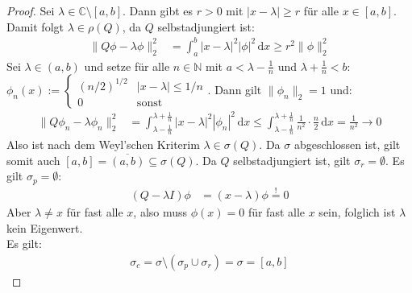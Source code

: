 \documentclass[a4paper,12pt]{article}
\newcommand{\intx}{}
\newcommand{\kla}{}
\newcommand{\klam}{}
\begin{document}
\begin{proof}
Sei $\lambda\in\mathbb{C}\setminus [a,b]$. Dann gibt es $r>0$ mit $|x-\lambda|\ge r$ für alle $x\in\klam\left[ {a, b} \right]$. Damit folgt $\lambda\in\rho(Q)$, da $Q$ selbstadjungiert ist:
\begin{align*}
\|Q\phi-\lambda\phi\|_2^2&=\intx\int_{a}^{b}|x-\lambda|^2|\phi|^2\,\mathrm{d}x\ge r^2\|\phi\|_2^2
\end{align*}
Sei $\lambda\in (a,b)$ und setze für alle $n\in\mathbb{N}$ mit $a<\lambda -\frac{1}{n}$ und $\lambda +\frac{1}{n}<b$: $\phi_n(x):=\left\{\begin{matrix}
(n/2)^{1/2} & |x-\lambda|\le 1/n \\
0 & \mathrm{sonst}
\end{matrix}\right.$. Dann gilt $\|\phi_n\|_2=1$ und:
\begin{align*}
\|Q\phi_n-\lambda\phi_n\|_2^2&=\intx\int_{\lambda-\frac{1}{n}}^{\lambda+\frac{1}{n}}|x-\lambda|^2|\phi_n|^2\,\mathrm{d}x\le\intx\int_{\lambda-\frac{1}{n}}^{\lambda+\frac{1}{n}}\frac{1}{n^2}\cdot\frac{n}{2}\,\mathrm{d}x=\frac{1}{n^2}\rightarrow 0
\end{align*}
Also ist nach dem Weyl'schen Kriterim $\lambda\in\sigma(Q)$. Da $\sigma$ abgeschlossen ist, gilt somit auch $\klam\left[ {a, b} \right]=\overline{\kla\left( {a, b} \right)}\subseteq\sigma(Q)$.
Da $Q$ selbstadjungiert ist, gilt $\sigma_r=\emptyset$. Es gilt $\sigma_p=\emptyset$:
\begin{align*}
(Q-\lambda I)\phi&=(x-\lambda)\phi\overset{!}{=}0
\end{align*}
Aber $\lambda\neq x$ für fast alle $x$, also muss $\phi(x)=0$ für fast alle $x$ sein, folglich ist $\lambda$ kein Eigenwert.\\
Es gilt:
\begin{align*}
\sigma_c=\sigma\setminus (\sigma_p\cup\sigma_r)=\sigma=\klam\left[ {a, b} \right]
\end{align*}
\end{proof}
\end{document}
